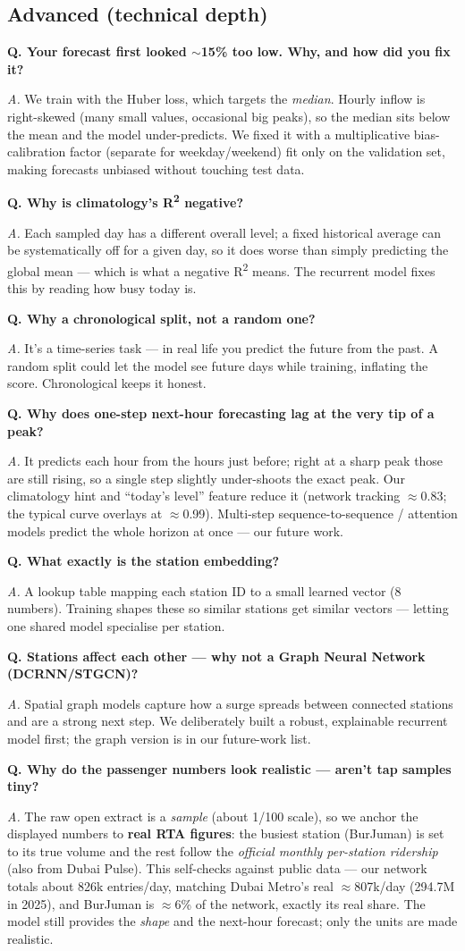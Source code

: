 \documentclass[11pt]{article}
\newcommand{\q}[1]{\medskip\noindent\textbf{Q. #1}\par\nopagebreak}
\newcommand{\an}[1]{\noindent\textit{A.} #1\par}
\begin{document}
\subsection{Advanced (technical depth)}
\q{Your forecast first looked $\sim$15\% too low. Why, and how did you fix it?}
\an{We train with the Huber loss, which targets the \emph{median}. Hourly inflow is right-skewed (many
small values, occasional big peaks), so the median sits below the mean and the model under-predicts.
We fixed it with a multiplicative bias-calibration factor (separate for weekday/weekend) fit only on
the validation set, making forecasts unbiased without touching test data.}
\q{Why is climatology's R\textsuperscript{2} negative?}
\an{Each sampled day has a different overall level; a fixed historical average can be systematically
off for a given day, so it does worse than simply predicting the global mean --- which is what a
negative R\textsuperscript{2} means. The recurrent model fixes this by reading how busy today is.}
\q{Why a chronological split, not a random one?}
\an{It's a time-series task --- in real life you predict the future from the past. A random split could
let the model see future days while training, inflating the score. Chronological keeps it honest.}
\q{Why does one-step next-hour forecasting lag at the very tip of a peak?}
\an{It predicts each hour from the hours just before; right at a sharp peak those are still rising, so a
single step slightly under-shoots the exact peak. Our climatology hint and ``today's level'' feature
reduce it (network tracking $\approx$0.83; the typical curve overlays at $\approx$0.99). Multi-step
sequence-to-sequence / attention models predict the whole horizon at once --- our future work.}
\q{What exactly is the station embedding?}
\an{A lookup table mapping each station ID to a small learned vector (8 numbers). Training shapes these
so similar stations get similar vectors --- letting one shared model specialise per station.}
\q{Stations affect each other --- why not a Graph Neural Network (DCRNN/STGCN)?}
\an{Spatial graph models capture how a surge spreads between connected stations and are a strong next
step. We deliberately built a robust, explainable recurrent model first; the graph version is in our
future-work list.}
\q{Why do the passenger numbers look realistic --- aren't tap samples tiny?}
\an{The raw open extract is a \emph{sample} (about 1/100 scale), so we anchor the displayed numbers to
\textbf{real RTA figures}: the busiest station (BurJuman) is set to its true volume and the rest follow
the \emph{official monthly per-station ridership} (also from Dubai Pulse). This self-checks against
public data --- our network totals about 826k entries/day, matching Dubai Metro's real
$\approx$807k/day (294.7M in 2025), and BurJuman is $\approx$6\% of the network, exactly its real
share. The model still provides the \emph{shape} and the next-hour forecast; only the units are made
realistic.}
\end{document}
